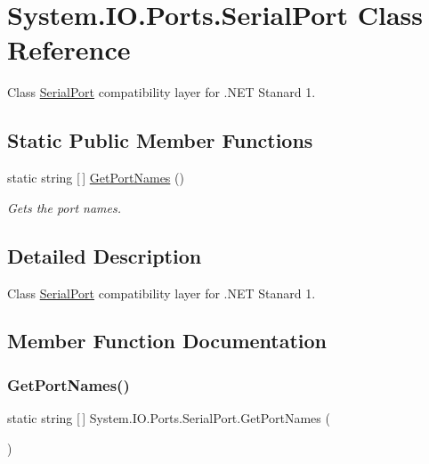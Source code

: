 \hypertarget{class_system_1_1_i_o_1_1_ports_1_1_serial_port}{}\section{System.\+I\+O.\+Ports.\+Serial\+Port Class Reference}
\label{class_system_1_1_i_o_1_1_ports_1_1_serial_port}


Class \mbox{\hyperlink{class_system_1_1_i_o_1_1_ports_1_1_serial_port}{Serial\+Port}} compatibility layer for .N\+ET Stanard 1.  


\subsection*{Static Public Member Functions}
\begin{DoxyCompactItemize}
\item 
static string \mbox{[}$\,$\mbox{]} \mbox{\hyperlink{class_system_1_1_i_o_1_1_ports_1_1_serial_port_ae77202ebeaff6096fe08d627ea5d6c06}{Get\+Port\+Names}} ()
\begin{DoxyCompactList}\small\item\em Gets the port names. \end{DoxyCompactList}\end{DoxyCompactItemize}


\subsection{Detailed Description}
Class \mbox{\hyperlink{class_system_1_1_i_o_1_1_ports_1_1_serial_port}{Serial\+Port}} compatibility layer for .N\+ET Stanard 1. 



\subsection{Member Function Documentation}
\mbox{\label{class_system_1_1_i_o_1_1_ports_1_1_serial_port_ae77202ebeaff6096fe08d627ea5d6c06}} 
\subsubsection{\texorpdfstring{GetPortNames()}{GetPortNames()}}
{\footnotesize\ttfamily static string \mbox{[}$\,$\mbox{]} System.\+I\+O.\+Ports.\+Serial\+Port.\+Get\+Port\+Names (\begin{DoxyParamCaption}{ }\end{DoxyParamCaption})\hspace{0.3cm}{\ttfamily [static]}}



